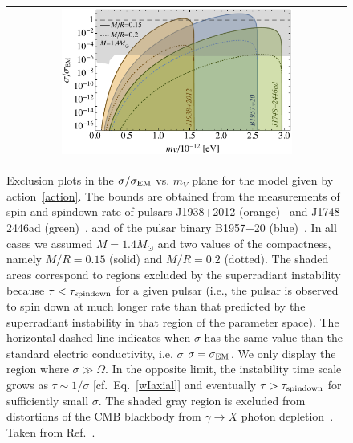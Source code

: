 \documentclass[11pt]{article}
\numberwithin{equation}{section} %
\begin{document}
%
\begin{figure}[th]
\begin{center}
\begin{tabular}{c}
  \includegraphics[width=0.7\textwidth]{sigma-mu-plane.pdf}
\end{tabular}
\caption{Exclusion plots in the $\sigma/\sigma_{\rm{EM}}$ vs. $m_V$ plane for the model given by action~\ref{action}. The bounds are obtained from the measurements of spin and spindown rate of pulsars J1938+2012 (orange)~\cite{Stovall:2016unz} and J1748-2446ad (green)~\cite{Hessels:2006ze}, and of the pulsar binary B1957+20 (blue)~\cite{Arzoumanian:1993qt}. In all cases we assumed $M= 1.4M_\odot$ and two values of the compactness, namely $M/R= 0.15$ (solid) and $M/R= 0.2$ (dotted). %
The shaded areas correspond to regions excluded by the superradiant instability because $\tau<\tau_{\rm spindown}$ for a given pulsar (i.e., the pulsar is observed to spin down at much longer rate than that predicted by the superradiant instability in that region of the parameter space). 
%
The horizontal dashed line indicates when $\sigma$ has the same value than the standard electric conductivity, i.e. $\sigma$ $\sigma=\sigma_{\rm EM}$.
%
We only display the region where $\sigma\gg \Omega$. In the opposite limit, the instability time scale grows as $\tau\sim1/\sigma$ [cf.\ Eq.~\eqref{wIaxial}] and eventually $\tau>\tau_{\rm spindown}$ for sufficiently small $\sigma$. 
The shaded gray region is excluded from distortions of the CMB blackbody from $\gamma\to X$ photon depletion~\cite{Mirizzi:2009iz}. Taken from Ref.~\cite{Cardoso:2017kgn}.
%
} \label{fig:pulsar}
\end{center}
\end{figure}
%
\end{document}
